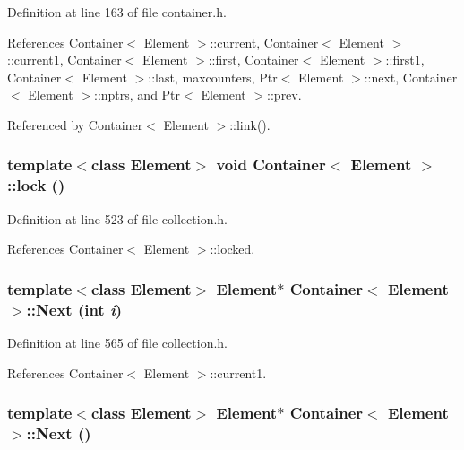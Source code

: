 Definition at line 163 of file container.h.

References Container$<$ Element $>$::current, Container$<$ Element $>$::current1, Container$<$ Element $>$::first, Container$<$ Element $>$::first1, Container$<$ Element $>$::last, maxcounters, Ptr$<$ Element $>$::next, Container$<$ Element $>$::nptrs, and Ptr$<$ Element $>$::prev.

Referenced by Container$<$ Element $>$::link().\hypertarget{classContainer_b8bc8b72ecaf5121c8119b93c2781e5f}{
\subsubsection[{lock}]{\setlength{\rightskip}{0pt plus 5cm}template$<$class Element$>$ void {\bf Container}$<$ Element $>$::lock ()}}
\label{classContainer_b8bc8b72ecaf5121c8119b93c2781e5f}




Definition at line 523 of file collection.h.

References Container$<$ Element $>$::locked.\hypertarget{classContainer_fccf98c4426883812b085ff0d9b610dc}{
\subsubsection[{Next}]{\setlength{\rightskip}{0pt plus 5cm}template$<$class Element$>$ Element$\ast$ {\bf Container}$<$ Element $>$::Next (int {\em i})}}
\label{classContainer_fccf98c4426883812b085ff0d9b610dc}




Definition at line 565 of file collection.h.

References Container$<$ Element $>$::current1.\hypertarget{classContainer_07f6034601c7bb0379e7e3669a86bdda}{
\subsubsection[{Next}]{\setlength{\rightskip}{0pt plus 5cm}template$<$class Element$>$ Element$\ast$ {\bf Container}$<$ Element $>$::Next ()}}
\label{classContainer_07f6034601c7bb0379e7e3669a86bdda}




